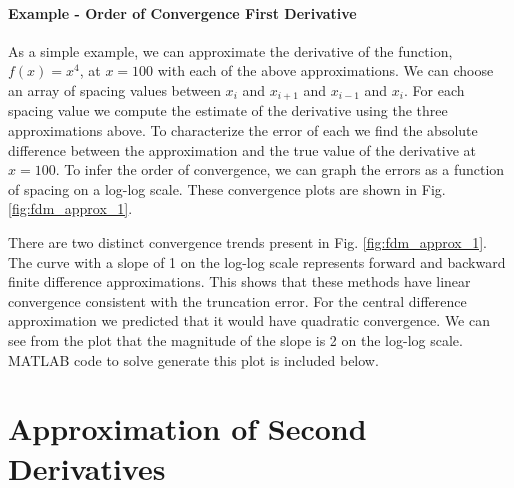 \paragraph{Example - Order of Convergence First Derivative}
As a simple example, we can approximate the derivative of the function, $f\left(x\right) = x^{4}$, at $x=100$ with
each of the above approximations. We can choose an array of spacing values between $x_{i}$ and $x_{i+1}$ and $x_{i-1}$
and $x_{i}$. For each spacing value we compute the estimate of the derivative using the three approximations above.
To characterize the error of each we find the absolute difference between the approximation and the true value of the
derivative at $x=100$. To infer the order of convergence, we can graph the errors as a function of spacing on a 
log-log scale. These convergence plots are shown in Fig. \ref{fig:fdm_approx_1}.
\par 
There are two distinct convergence trends present in Fig. \ref{fig:fdm_approx_1}.  The curve with a slope of 1 on
the log-log scale represents forward and backward finite difference approximations. This shows that these methods
have linear convergence consistent with the truncation error. For the central difference approximation we predicted
that it would have quadratic convergence. We can see from the plot that the magnitude of the slope is 2 on the log-log scale.
MATLAB code to solve generate this plot is included below.


\section{Approximation of Second Derivatives}

